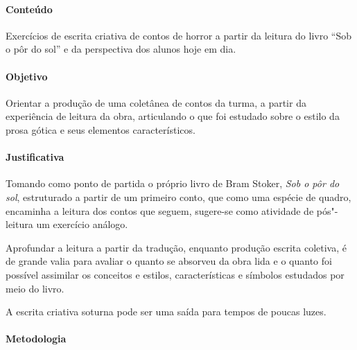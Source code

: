 \documentclass[12pt]{extarticle}
\begin{document}
\paragraph{Conteúdo} Exercícios de escrita criativa de contos de horror a partir
da leitura do livro ``Sob o pôr do sol'' e da perspectiva dos alunos hoje em dia.

\paragraph{Objetivo} Orientar a produção de uma coletânea de contos da turma, a partir 
da experiência de leitura da obra, articulando o que foi estudado sobre o estilo da prosa 
gótica e seus elementos característicos. 

\paragraph{Justificativa} Tomando como ponto de partida o próprio livro de Bram Stoker, 
\textit{Sob o pôr do sol}, estruturado a partir de um primeiro conto, que como uma 
espécie de quadro, encaminha a leitura dos contos que seguem, sugere-se como atividade de pós"-leitura 
um exercício análogo. 

Aprofundar a leitura a partir da tradução, enquanto produção escrita coletiva, é de grande valia
para avaliar o quanto se absorveu da obra lida e o quanto foi possível assimilar os conceitos e 
estilos, características e símbolos estudados por meio do livro. 

A escrita criativa soturna pode ser uma saída para tempos de poucas luzes. 

\paragraph{Metodologia}
\end{document}
